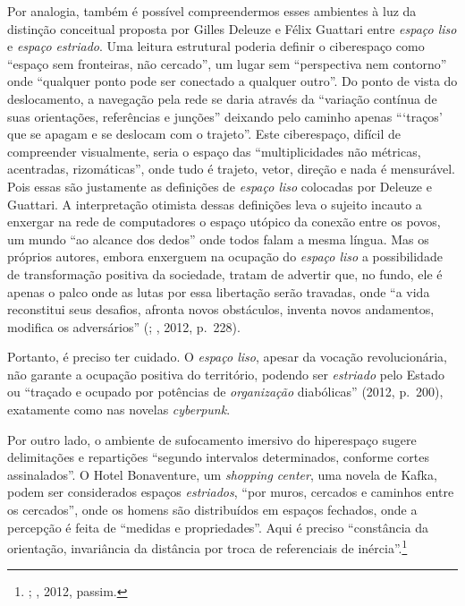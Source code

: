 Por analogia, também é possível compreendermos esses ambientes à luz da
distinção conceitual proposta por Gilles Deleuze e Félix Guattari entre
\emph{espaço liso} e \emph{espaço estriado}. Uma leitura
estrutural poderia definir o ciberespaço como ``espaço sem fronteiras,
não cercado'', um lugar sem ``perspectiva nem contorno'' onde ``qualquer
ponto pode ser conectado a qualquer outro''. Do ponto de vista do
deslocamento, a navegação pela rede se daria através da ``variação
contínua de suas orientações, referências e junções'' deixando pelo
caminho apenas ```traços' que se apagam e se deslocam com o trajeto''.
Este ciberespaço, difícil de compreender visualmente, seria o espaço das
``multiplicidades não métricas, acentradas, rizomáticas'', onde tudo é
trajeto, vetor, direção e nada é mensurável. Pois essas são justamente
as definições de \emph{espaço liso} colocadas por Deleuze e Guattari. A
interpretação otimista dessas definições leva o sujeito incauto a
enxergar na rede de computadores o espaço utópico da conexão entre os
povos, um mundo ``ao alcance dos dedos'' onde todos falam a mesma
língua. Mas os próprios autores, embora enxerguem na ocupação do
\emph{espaço liso} a possibilidade de transformação positiva da
sociedade, tratam de advertir que, no fundo, ele é apenas o palco onde
as lutas por essa libertação serão travadas, onde ``a vida reconstitui
seus desafios, afronta novos obstáculos, inventa novos andamentos,
modifica os adversários'' (; , 2012, p.~228).

Portanto, é preciso ter cuidado. O \emph{espaço liso}, apesar da vocação
revolucionária, não garante a ocupação positiva do território, podendo
ser \emph{estriado} pelo Estado ou ``traçado e ocupado por potências de
\emph{organização} diabólicas'' (2012, p.~200), exatamente como nas
novelas \emph{cyberpunk}.

Por outro lado, o ambiente de sufocamento imersivo do hiperespaço
sugere delimitações e repartições ``segundo intervalos
determinados, conforme cortes assinalados''. O Hotel Bonaventure, um
\emph{shopping center}, uma novela de Kafka, podem ser considerados espaços
\emph{estriados}, ``por muros, cercados e caminhos entre os cercados'',
onde os homens são distribuídos em espaços fechados, onde a percepção é
feita de ``medidas e propriedades''. Aqui é preciso ``constância da
orientação, invariância da distância por troca de referenciais de
inércia''.\footnote{; , 2012, passim.}

